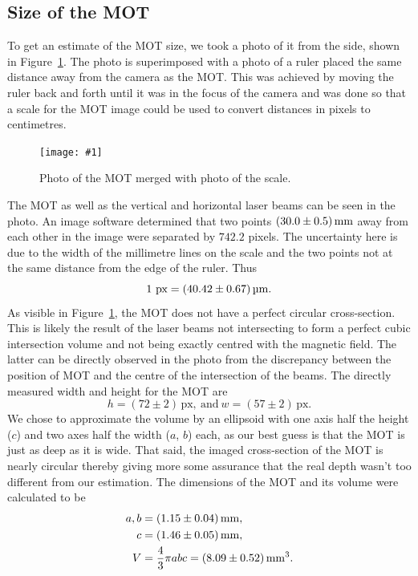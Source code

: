 \documentclass[twocolumn]{article}
\newcommand{\insertFigure}[1]{%
   \texttt{[image: \#1]}%
}
\begin{document}
\subsection{Size of the MOT}
To get an estimate of the MOT size, we took a photo of it from the side, shown in Figure~\ref{fig:mot_w_scale}. The photo is superimposed with a photo of a ruler placed the same distance away from the camera as the MOT. This was achieved by moving the ruler back and forth until it was in the focus of the camera and was done so that a scale for the MOT image could be used to convert distances in pixels to centimetres.
\begin{figure} [!h]
	\centering
	\insertFigure{Images/MOT_w_scale_crop.png}
	\caption{Photo of the MOT merged with photo of the scale.}
	\label{fig:mot_w_scale}
\end{figure}
The MOT as well as the vertical and horizontal laser beams can be seen in the photo. An image software determined that two points $\SI[separate-uncertainty = true]{30.0 \pm 0.5 }{\milli\meter}$ away from each other in the image were separated by $742.2$ pixels. The uncertainty here is due to the width of the millimetre lines on the scale and the two points not at the same distance from the edge of the ruler. Thus
\begin{equation}
1 \text{~px} = \SI[separate-uncertainty = true]{40.42 \pm 0.67}{\micro\meter}. \nonumber
\end{equation}
As visible in Figure~\ref{fig:mot_w_scale}, the MOT does not have a perfect circular cross-section. This is likely the result of the laser beams not intersecting to form a perfect cubic intersection volume and not being exactly centred with the magnetic field. The latter can be directly observed in the photo from the discrepancy between the position of MOT and the centre of the intersection of the beams. The directly measured width and height for the MOT are
$$
h = (72 \pm 2)  \, \text{px}, \: \text{and} \: w = (57 \pm 2)  \, \text{px}.
$$
We chose to approximate the volume by an ellipsoid with one axis half the height ($c$) and two axes half the width ($a$, $b$) each, as our best guess is that the MOT is just as deep as it is wide. That said, the imaged cross-section of the MOT is nearly circular thereby giving more some assurance that the real depth wasn't too different from our estimation. The dimensions of the MOT and its volume were calculated to be
\begin{align*}
a, b &= \SI[separate-uncertainty = true]{1.15 \pm 0.04}{\milli\meter}, \\
c &=  \SI[separate-uncertainty = true]{1.46 \pm 0.05}{\milli\meter}, \\
V &= \frac{4}{3} \pi a b c = \SI[separate-uncertainty = true]{8.09 \pm 0.52 }{\cubic\milli\meter}.
\end{align*}
\end{document}
